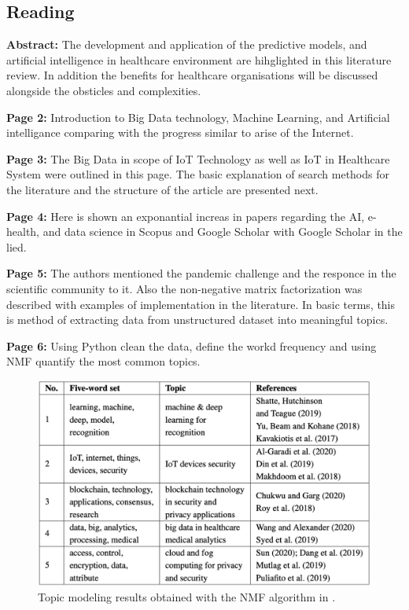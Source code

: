 \subsection{Reading}
    \textbf{Abstract:}
    The development and application of the predictive models, and artificial intelligence in healthcare environment are hihglighted in this literature review. In addition the benefits for healthcare organisations will be discussed alongside the obsticles and complexities.
    
    \textbf{Page 2:}
    Introduction to Big Data technology, Machine Learning, and Artificial intelligance comparing with the progress similar to arise of the Internet.
    
    \textbf{Page 3:}
    The Big Data in scope of IoT Technology as well as IoT in Healthcare System were outlined in this page. The basic explanation of search methods for the literature and the structure of the article are presented next.
    
    \textbf{Page 4:}
    Here is shown an exponantial increas in papers regarding the AI, e-health, and data science in Scopus and Google Scholar with Google Scholar in the lied.
    
    \textbf{Page 5:}
    The authors mentioned the pandemic challenge and the responce in the scientific community to it. Also the non-negative matrix factorization was described with examples of implementation in the literature. In basic terms, this is method of extracting data from unstructured dataset into meaningful topics.
    
    \textbf{Page 6:}
    Using Python clean the data, define the workd frequency and using NMF quantify the most common topics.
    \begin{figure}[H]
        \centering
        \includegraphics[width=1\textwidth]{figures/SR0008ES23/fig1.png}
        \caption{Topic modeling results obtained with the NMF algorithm in \cite{x249}.}
        \label{fig1:SR0008ES23}
    \end{figure}
    
